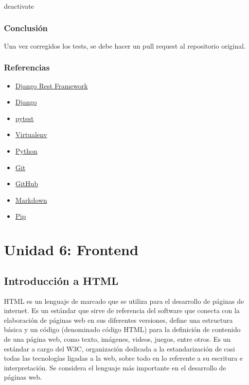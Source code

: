 \documentclass[
  a4paper,
  DIV=11,
  numbers=noendperiod,
  onepage,
  openany]{scrreprt}
\newenvironment{Shaded}{\begin{snugshade}}{\end{snugshade}}
\newcommand{\NormalTok}[1]{\textcolor[rgb]{0.00,0.23,0.31}{#1}}
\providecommand{\tightlist}{%
  \setlength{\itemsep}{0pt}\setlength{\parskip}{0pt}}\usepackage{longtable,booktabs,array}
\begin{document}
\begin{tcolorbox}
\begin{Shaded}
\begin{Highlighting}[]
\NormalTok{deactivate}
\end{Highlighting}
\end{Shaded}

\section{Conclusión}\label{conclusiuxf3n-3}

Una vez corregidos los tests, se debe hacer un pull request al
repositorio original.

\section{Referencias}\label{referencias-1}

\begin{itemize}
\tightlist
\item
  \href{https://www.django-rest-framework.org/}{Django Rest Framework}
\item
  \href{https://www.djangoproject.com/}{Django}
\item
  \href{https://docs.pytest.org/en/latest/}{pytest}
\item
  \href{https://virtualenv.pypa.io/en/latest/}{Virtualenv}
\item
  \href{https://www.python.org/}{Python}
\item
  \href{https://git-scm.com/}{Git}
\item
  \href{https://www.github.com/}{GitHub}
\item
  \href{https://www.markdownguide.org/}{Markdown}
\item
  \href{https://pypi.org/project/pip/}{Pip}
\end{itemize}

\part{Unidad 6: Frontend}

\chapter{Introducción a HTML}\label{introducciuxf3n-a-html}

HTML es un lenguaje de marcado que se utiliza para el desarrollo de
páginas de internet. Es un estándar que sirve de referencia del software
que conecta con la elaboración de páginas web en sus diferentes
versiones, define una estructura básica y un código (denominado código
HTML) para la definición de contenido de una página web, como texto,
imágenes, videos, juegos, entre otros. Es un estándar a cargo del W3C,
organización dedicada a la estandarización de casi todas las tecnologías
ligadas a la web, sobre todo en lo referente a su escritura e
interpretación. Se considera el lenguaje más importante en el desarrollo
de páginas web.


\end{tcolorbox}
\end{document}

